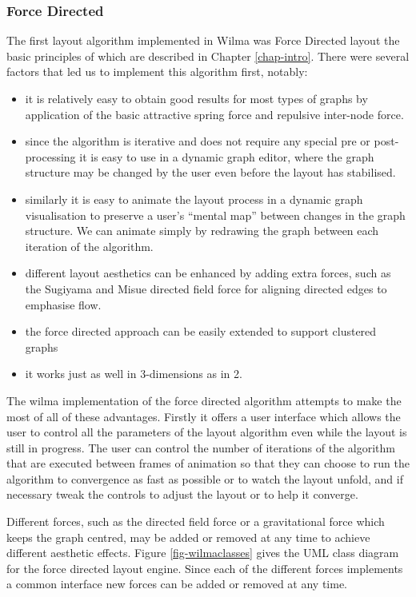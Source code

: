 \documentclass[runningheads]{cl2emult}
\begin{document}
\subsubsection{Force Directed} \label{sec:forcedirectedlayout}
The first layout algorithm implemented in Wilma was Force Directed
layout the basic principles of which are described in Chapter
\ref{chap-intro}.  There were several factors that led us to
implement this algorithm first, notably:
\begin{itemize}
\item it is relatively easy to obtain good results for most types of
graphs by application of the basic attractive spring force and
repulsive inter-node force.
\item since the algorithm is iterative and does not require any
special pre or post-processing it is easy to use in a dynamic graph
editor, where the graph structure may be changed by the user even
before the layout has stabilised.
\item similarly it is easy to animate the layout process in a dynamic
graph visualisation to preserve a user's ``mental map''\cite{Misue:VLC95}
between changes in the graph structure.  We can animate simply by
redrawing the graph between each iteration of the algorithm.
\item different layout
aesthetics can be enhanced by adding extra forces, such as the Sugiyama and Misue\cite{Sugiyama:VLC95}
directed field force for aligning directed edges to emphasise flow.
\item the force directed approach can be easily extended to support
clustered graphs \cite{Huang:GD98}
\item it works just as well in 3-dimensions as in 2.
\end{itemize}
The wilma implementation of the force directed algorithm attempts to make the most
of all of these advantages.  Firstly it offers a user interface which
allows the user to control all the parameters of the layout algorithm
even while the layout is still in progress.  The user can control the
number of iterations of the algorithm that are executed between frames
of animation so that they can choose to run the algorithm to
convergence as fast as possible or to watch the layout unfold, and if
necessary tweak the controls to adjust the layout or to help it
converge.

Different forces, such as the directed field force or
a gravitational force which keeps the graph centred, may be added or removed
at any time to achieve different aesthetic effects.  Figure
\ref{fig-wilmaclasses} gives the UML class diagram for the force
directed layout engine.  Since each of the different forces implements
a common interface new forces can be added or removed at any time.
\end{document}
